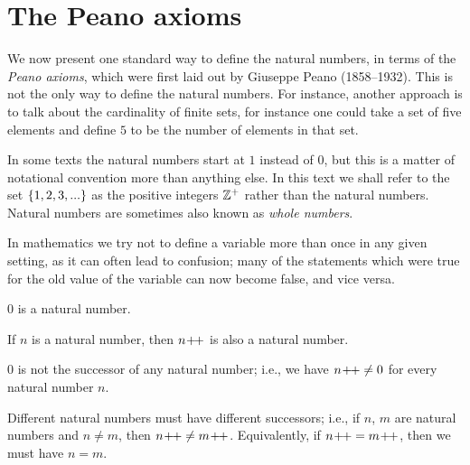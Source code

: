\section{The Peano axioms}\label{sec:2.1}

\begin{note}
  We now present one standard way to define the natural numbers, in terms of the \emph{Peano axioms}, which were first laid out by Giuseppe Peano (1858--1932).
  This is not the only way to define the natural numbers.
  For instance, another approach is to talk about the cardinality of finite sets, for instance one could take a set of five elements and define \(5\) to be the number of elements in that set.
\end{note}

\begin{note}
  In some texts the natural numbers start at \(1\) instead of \(0\), but this is a matter of notational convention more than anything else.
  In this text we shall refer to the set \(\left\lbrace1, 2, 3,...\right\rbrace\) as the positive integers \(\mathbb{Z}^+\) rather than the natural numbers.
  Natural numbers are sometimes also known as \emph{whole numbers}.
\end{note}

\begin{note}
  In mathematics we try not to define a variable more than once in any given setting, as it can often lead to confusion;
  many of the statements which were true for the old value of the variable can now become false, and vice versa.
\end{note}

\begin{ax}\label{2.1}
  \(0\) is a natural number.
\end{ax}

\begin{ax}\label{2.2}
  If \(n\) is a natural number, then \(n\!+\!\!+\) is also a natural number.
\end{ax}

\begin{ax}\label{2.3}
  \(0\) is not the successor of any natural number;
  i.e., we have \(n\!+\!\!+ \neq 0\) for every natural number \(n\).
\end{ax}

\begin{ax}\label{2.4}
  Different natural numbers must have different successors;
  i.e., if \(n\), \(m\) are natural numbers and \(n \neq m\), then \(n\!+\!\!+ \neq m\!+\!\!+\).
  Equivalently, if \(n\!+\!\!+ = m\!+\!\!+\), then we must have \(n = m\).
\end{ax}

